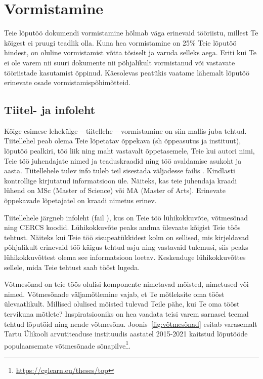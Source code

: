 \section{Vormistamine}  \label{vormistamine}
Teie lõputöö dokumendi vormistamine hõlmab väga erinevaid tööriistu, millest Te kõigest ei pruugi teadlik olla. Kuna hea vormistamine on 25\% Teie lõputöö hindest, on oluline vormistamist võtta tõsiselt ja varuda selleks aega. Eriti kui Te ei ole varem nii suuri dokumente nii põhjalikult vormistanud või vastavate tööriistade kasutamist õppinud. Käesolevas peatükis vaatame lähemalt lõputöö erinevate osade vormistamispõhimõtteid.

\subsection{Tiitel- ja infoleht}
Kõige esimese lehekülge – tiitellehe – vormistamine on siin mallis juba tehtud. Tiitellehel peab olema Teie lõpetatav õppekava (sh õppeasutus ja instituut), lõputöö pealkiri, töö liik ning maht vastavalt õppetasemele, Teie kui autori nimi, Teie töö juhendajate nimed ja teaduskraadid ning töö avaldamise asukoht ja aasta. Tiitellehele tulev info tuleb teil sisestada väljadesse failis . Kindlasti kontrollige kirjutatud informatsioon üle. Näiteks, kas teie juhendaja kraadi lühend on MSc (Master of Science) või MA (Master of Arts). Erinevate õppekavade lõpetajatel on kraadi nimetus erinev.

Tiitellehele järgneb infoleht (fail ), kus on Teie töö lühikokkuvõte, võtmesõnad ning CERCS koodid. Lühikokkuvõte peaks andma ülevaate kõigist Teie töös tehtust. Näiteks kui Teie töö sisupeatükkidest kolm on sellised, mis kirjeldavad põhjalikult erinevaid töö käigus tehtud asju ning vastavaid tulemusi, siis peaks lühikokkuvõttest olema see informatsioon loetav. Keskenduge lühikokkuvõttes sellele, mida Teie tehtust saab tööst lugeda.

Võtmesõnad on teie töös olulisi komponente nimetavad mõisted, nimetused või nimed. Võtmesõnade väljamõtlemine vajab, et Te mõtleksite oma tööst ülevaatlikult. Millised olulised mõisted tulevad Teile pähe, kui Te oma tööst tervikuna mõtlete? Inspiratsiooniks on hea vaadata teisi varem sarnasel teemal tehtud lõputöid ning nende võtmesõnu. Joonis~\ref{fig:võtmesõnad} esitab varasemalt Tartu Ülikooli arvutiteaduse instituudis aastatel 2015-2021 kaitstud lõputööde populaarsemate võtmesõnade sõnapilve\footnote{\url{https://cglearn.eu/theses/top}}.

